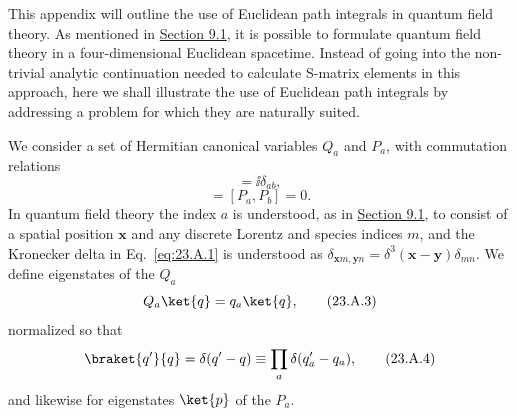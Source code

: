 \label{app:23.A}

This appendix will outline the use of Euclidean path integrals in quantum field theory. As mentioned in \hyperref[sec:9.1]{Section 9.1}, it is possible to formulate quantum field theory in a four-dimensional Euclidean spacetime. Instead of going into the non-trivial analytic continuation needed to calculate S-matrix elements in this approach, here we shall illustrate the use of Euclidean path integrals by addressing a problem for which they are naturally suited.

We consider a set of Hermitian canonical variables $Q_a$ and $P_a$, with commutation relations
\begin{equation}
 [Q_a,P_b]=\ii\delta_{ab},
 \tag{23.A.1}\label{eq:23.A.1}
\end{equation}
\begin{equation}
 [Q_a,Q_b]=[P_a,P_b]=0.
 \tag{23.A.2}\label{eq:23.A.2}
\end{equation}
In quantum field theory the index $a$ is understood, as in \hyperref[sec:9.1]{Section 9.1}, to consist of a spatial position $\mathbf x$ and any discrete Lorentz and species indices $m$, and the Kronecker delta in Eq.~\eqref{eq:23.A.1} is understood as $\delta_{\mathbf x m,\mathbf y n}=\delta^3(\mathbf x-\mathbf y)\delta_{mn}$. We define eigenstates of the $Q_a$
\begin{equation}
 Q_a\ket{q}=q_a\ket{q},
 \tag{23.A.3}\label{eq:23.A.3}
\end{equation}
normalized so that
\begin{equation}
 \braket{q'}{q}=\delta(q'-q)\equiv\prod_a\delta(q'_a-q_a),
 \tag{23.A.4}\label{eq:23.A.4}
\end{equation}
and likewise for eigenstates $\ket{p}$ of the $P_a$.

